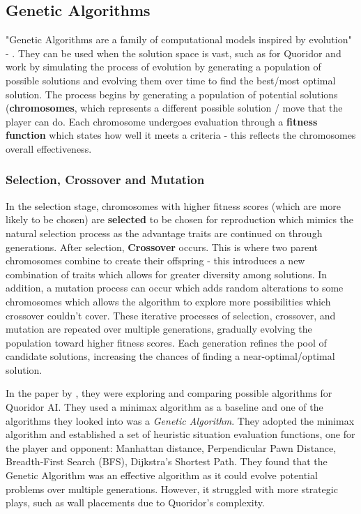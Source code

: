 \documentclass[review]{cmpreport}
\begin{document}
\subsection{Genetic Algorithms}
"Genetic Algorithms are a family of computational models inspired by evolution" - \cite{mathew2012genetic}. They can be used when the solution space is vast, such as for Quoridor and work by simulating the process of evolution by generating a population of possible solutions and evolving them over time to find the best/most optimal solution. The process begins by generating a population of potential solutions (\textbf{chromosomes}, which represents a different possible solution / move that the player can do. Each chromosome undergoes evaluation through a \textbf{fitness function} which states how well it meets a criteria - this reflects the chromosomes overall effectiveness.

\subsubsection{Selection, Crossover and Mutation}
In the selection stage, chromosomes with higher fitness scores (which are more likely to be chosen) are \textbf{selected} to be chosen for reproduction which mimics the natural selection process as the advantage traits are continued on through generations. After selection, \textbf{Crossover} occurs. This is where two parent chromosomes combine to create their offspring - this introduces a new combination of traits which allows for greater diversity among solutions. In addition, a mutation process can occur which adds random alterations to some chromosomes which allows the algorithm to explore more possibilities which crossover couldn't cover. These iterative processes of selection, crossover, and mutation are repeated over multiple generations, gradually evolving the population toward higher fitness scores. Each generation refines the pool of candidate solutions, increasing the chances of finding a near-optimal/optimal solution.
\newline

\noindent In the paper by \cite{josequoridor}, they were exploring and comparing possible algorithms for Quoridor AI. They used a minimax algorithm as a baseline and one of the algorithms they looked into was a \textit{Genetic Algorithm}. They adopted the minimax algorithm and established a set of heuristic situation evaluation functions, one for the player and opponent: Manhattan distance, Perpendicular Pawn Distance, Breadth-First Search (BFS), Dijkstra's Shortest Path. They found that the Genetic Algorithm was an effective algorithm as it could evolve potential problems over multiple generations. However, it struggled with more strategic plays, such as wall placements due to Quoridor's complexity.
\end{document}
